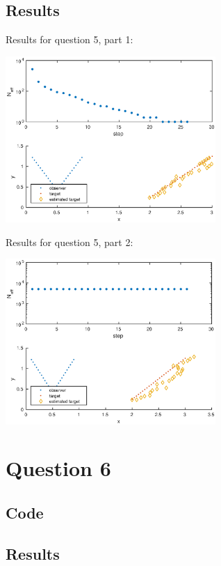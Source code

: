 \documentclass[english,DIV=13]{scrreprt}
\begin{document}
\section*{Results}
Results for question 5, part 1:
\begin{center}
   \includegraphics[width=0.6\textwidth]{img/q51.eps}
\end{center}

Results for question 5, part 2:
\begin{center}
   \includegraphics[width=0.6\textwidth]{img/q52.eps}
\end{center}

\chapter{Question 6}
\section*{Code}


\section*{Results}
\end{document}
